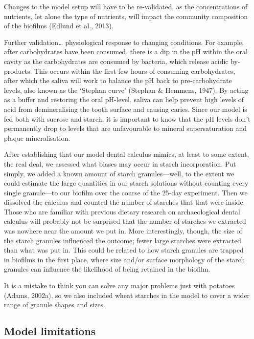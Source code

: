 \documentclass[
  letterpaper,
]{book}
\begin{document}
Changes to the model setup will have to be re-validated, as the
concentrations of nutrients, let alone the type of nutrients, will
impact the community composition of the biofilms (Edlund et al., 2013).

Further validation\ldots{} physiological response to changing
conditions. For example, after carbohydrates have been consumed, there
is a dip in the pH within the oral cavity as the carbohydrates are
consumed by bacteria, which release acidic by-products. This occurs
within the first few hours of consuming carbohydrates, after which the
saliva will work to balance the pH back to pre-carbohydrate levels, also
known as the `Stephan curve' (Stephan \& Hemmens, 1947). By acting as a
buffer and restoring the oral pH-level, saliva can help prevent high
levels of acid from demineralising the tooth surface and causing caries.
Since our model is fed both with sucrose and starch, it is important to
know that the pH levels don't permanently drop to levels that are
unfavourable to mineral supersaturation and plaque mineralisation.

After establishing that our model dental calculus mimics, at least to
some extent, the real deal, we assessed what biases may occur in starch
incorporation. Put simply, we added a known amount of starch
granules---well, to the extent we could estimate the large quantities in
our starch solutions without counting every single granule---to our
biofilm over the course of the 25-day experiment. Then we dissolved the
calculus and counted the number of starches that that were inside. Those
who are familiar with previous dietary research on archaeological dental
calculus will probably not be surprised that the number of starches we
extracted was nowhere near the amount we put in. More interestingly,
though, the size of the starch granules influenced the outcome; fewer
large starches were extracted than what was put in. This could be
related to how starch granules are trapped in biofilms in the first
place, where size and/or surface morphology of the starch granules can
influence the likelihood of being retained in the biofilm.

It is a mistake to think you can solve any major problems just with
potatoes (Adams, 2002a), so we also included wheat starches in the model
to cover a wider range of granule shapes and sizes.

\hypertarget{disc-model-limitations}{%
\subsection{Model limitations}\label{disc-model-limitations}}
\end{document}
